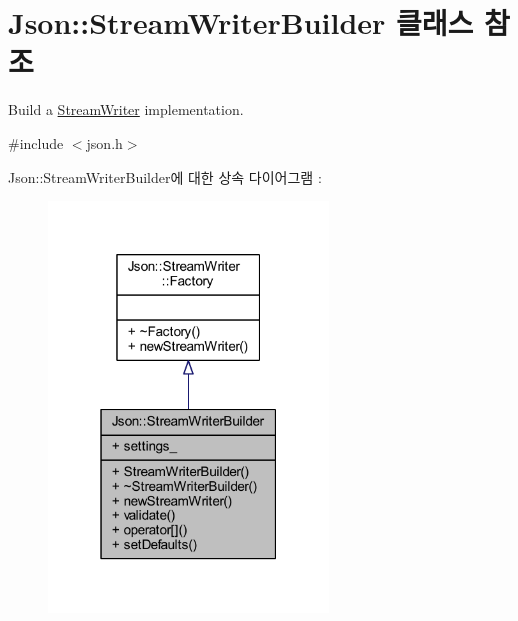 \hypertarget{class_json_1_1_stream_writer_builder}{}\section{Json\+:\+:Stream\+Writer\+Builder 클래스 참조}
\label{class_json_1_1_stream_writer_builder}


Build a \hyperlink{class_json_1_1_stream_writer}{Stream\+Writer} implementation.  




{\ttfamily \#include $<$json.\+h$>$}



Json\+:\+:Stream\+Writer\+Builder에 대한 상속 다이어그램 \+: \nopagebreak
\begin{figure}[H]
\begin{center}
\leavevmode
\includegraphics[width=211pt]{class_json_1_1_stream_writer_builder__inherit__graph}
\end{center}
\end{figure}


